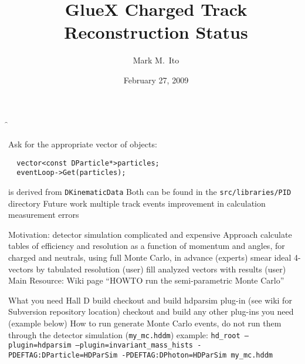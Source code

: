 \documentclass[xcolor=dvipsnames]{beamer}
\begin{document}
\title{GlueX Charged Track Reconstruction Status}
\author[M.\ Ito]{Mark M.\ Ito}
\date{February 27, 2009}


\f{\titlepage}

\begin{frame}[fragile]
  \be
  \I Ask for the appropriate vector of objects:
\begin{verbatim}
  vector<const DParticle*>particles;
  eventLoop->Get(particles);
\end{verbatim}
   is derived from {\tt DKinematicData}
  \I Both can be found in the {\tt src/libraries/PID} directory
  \I Future work
    \be
    \I multiple track events
    \I improvement in calculation measurement errors
    \ee
  \ee
\end{frame}

\f{
  \be
  \I Motivation: detector simulation complicated and expensive
  \I Approach
    \be
    \I calculate tables of efficiency and resolution as a function of momentum
    and angles, for charged and neutrals, using full Monte Carlo, in advance
    (experts)
    \I smear ideal 4-vectors by tabulated resolution (user)
    \I fill analyzed vectors with results (user)
    \ee
  \I Main Resource: Wiki page ``HOWTO run the semi-parametric Monte Carlo''
  \ee
}

\f{
  \be
  \I What you need
    \be
    \I Hall D build
    \I checkout and build hdparsim plug-in (see wiki for Subversion repository
    location)
    \I checkout and build any other plug-ins you need (example below)
    \ee
  \I How to run
    \be
    \I generate Monte Carlo events, do not run them through the detector
    simulation ({\tt my\_mc.hddm})
    \I example: {\tt hd\_root --plugin=hdparsim --plugin=invariant\_mass\_hists
      -PDEFTAG:DParticle=HDParSim -PDEFTAG:DPhoton=HDParSim my\_mc.hddm}
    \ee
  \ee
}
\end{document}
